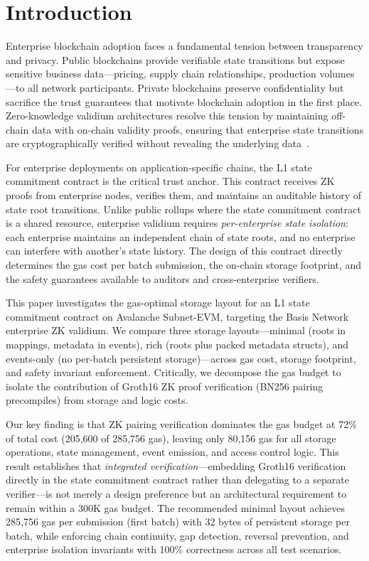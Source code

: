 \section{Introduction}
\label{sec:introduction}

Enterprise blockchain adoption faces a fundamental tension between transparency and
privacy. Public blockchains provide verifiable state transitions but expose sensitive
business data---pricing, supply chain relationships, production volumes---to all network
participants. Private blockchains preserve confidentiality but sacrifice the trust
guarantees that motivate blockchain adoption in the first place. Zero-knowledge validium
architectures resolve this tension by maintaining off-chain data with on-chain validity
proofs, ensuring that enterprise state transitions are cryptographically verified without
revealing the underlying data~\cite{starkware2024validium, ethereum2024rollups}.

For enterprise deployments on application-specific chains, the L1 state commitment
contract is the critical trust anchor. This contract receives ZK proofs from enterprise
nodes, verifies them, and maintains an auditable history of state root transitions. Unlike
public rollups where the state commitment contract is a shared resource, enterprise
validium requires \emph{per-enterprise state isolation}: each enterprise maintains an
independent chain of state roots, and no enterprise can interfere with another's state
history. The design of this contract directly determines the gas cost per batch submission,
the on-chain storage footprint, and the safety guarantees available to auditors and
cross-enterprise verifiers.

This paper investigates the gas-optimal storage layout for an L1 state commitment contract
on Avalanche Subnet-EVM, targeting the Basis Network enterprise ZK validium. We compare
three storage layouts---minimal (roots in mappings, metadata in events), rich (roots plus
packed metadata structs), and events-only (no per-batch persistent storage)---across gas
cost, storage footprint, and safety invariant enforcement. Critically, we decompose the gas
budget to isolate the contribution of Groth16 ZK proof verification (BN256 pairing
precompiles) from storage and logic costs.

Our key finding is that ZK pairing verification dominates the gas budget at 72\% of total
cost (205,600 of 285,756 gas), leaving only 80,156 gas for all storage operations, state
management, event emission, and access control logic. This result establishes that
\emph{integrated verification}---embedding Groth16 verification directly in the state
commitment contract rather than delegating to a separate verifier---is not merely a
design preference but an architectural requirement to remain within a 300K gas budget.
The recommended minimal layout achieves 285,756 gas per submission (first batch) with
32 bytes of persistent storage per batch, while enforcing chain continuity, gap detection,
reversal prevention, and enterprise isolation invariants with 100\% correctness across
all test scenarios.
